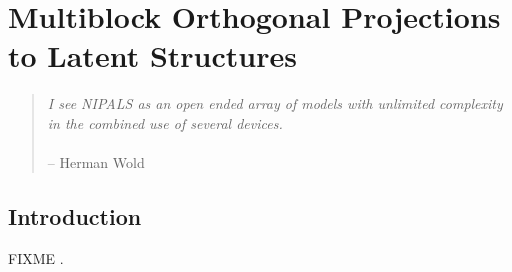 
\chapter{Multiblock Orthogonal Projections to Latent Structures}

\begin{quote}
{\it
  I see NIPALS as an open ended array of models with unlimited complexity
  in the combined use of several devices.}
\\\\
 -- Herman Wold
\end{quote}

\section{Introduction}

\begin{doublespace}
FIXME \cite{westerhuis:jchemo1998}.
\end{doublespace}




